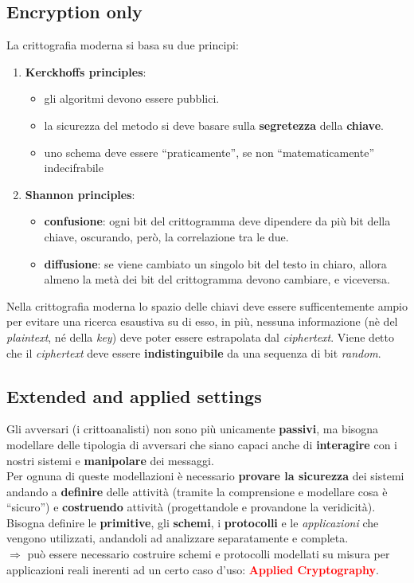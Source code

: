 \subsection{Encryption only}
La crittografia moderna si basa su due principi:
\begin{enumerate}[nosep]
    \item \textbf{Kerckhoffs principles}:
    \begin{itemize}[nosep]
        \item gli algoritmi devono essere pubblici.
        \item la sicurezza del metodo si deve basare sulla \textbf{segretezza} della \textbf{chiave}.
        \item uno schema deve essere ``praticamente'', se non ``matematicamente'' indecifrabile
    \end{itemize}
    \item \textbf{Shannon principles}:
    \begin{itemize}[nosep]
        \item \textbf{confusione}: ogni bit del crittogramma deve dipendere da più bit della chiave, oscurando, però, la correlazione tra le due.
        \item \textbf{diffusione}: se viene cambiato un singolo bit del testo in chiaro, allora almeno la metà dei bit del crittogramma devono cambiare, e viceversa.
    \end{itemize}
\end{enumerate}
Nella crittografia moderna lo spazio delle chiavi deve essere sufficentemente ampio per evitare una ricerca esaustiva su di esso, in più, nessuna informazione (nè del \textit{plaintext}, né della \textit{key}) deve poter essere estrapolata dal \textit{ciphertext}. Viene detto che il \textit{ciphertext} deve essere \textbf{indistinguibile} da una sequenza di bit \textit{random}.

\subsection{Extended and applied settings}
Gli avversari (i crittoanalisti) non sono più unicamente \textbf{passivi}, ma bisogna modellare delle tipologia di avversari che siano capaci anche di \textbf{interagire} con i nostri sistemi e \textbf{manipolare} dei messaggi. \\
Per ognuna di queste modellazioni è necessario \textbf{provare la sicurezza} dei sistemi andando a \textbf{definire} delle attività (tramite la comprensione e modellare cosa è ``sicuro'') e \textbf{costruendo} attività (progettandole e provandone la veridicità). \\ \newline
Bisogna definire le \textbf{primitive}, gli \textbf{schemi}, i \textbf{protocolli} e le \textit{applicazioni} che vengono utilizzati, andandoli ad analizzare separatamente e completa. \\
$\Rightarrow$ può essere necessario costruire schemi e protocolli modellati su misura per applicazioni reali inerenti ad un certo caso d'uso: \textcolor{red}{\textbf{Applied Cryptography}}.


